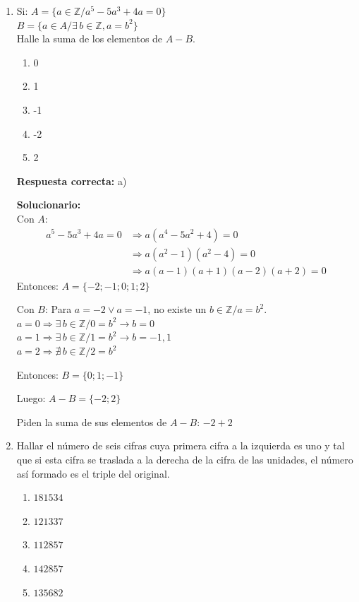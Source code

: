 \begin{enumerate}
	
	
	\item Si: 
	$A = \{ a \in \mathbb{Z} / a^5 - 5a^3 + 4a = 0 \}$ \\
	$B = \{ a \in A / \exists \, b \in \mathbb{Z}, a = b^2 \}$ \\
	Halle la suma de los elementos de $A - B$.
	
	\begin{enumerate}[label=\alph*)]
	\item 0
	\item 1
	\item -1
	\item -2
	\item 2
	\end{enumerate}
	
	\textbf{Respuesta correcta:} a)
	
	\vspace{2mm}
	\textbf{Solucionario:}\\
	Con $A$: 
	\begin{align*}
		a^5 - 5a^3 + 4a = 0 &\Rightarrow a(a^4 - 5a^2 + 4) = 0 \\
		&\Rightarrow a(a^2 - 1)(a^2 - 4) = 0 \\
		&\Rightarrow a(a-1)(a+1)(a-2)(a+2) = 0
	\end{align*}
	Entonces: $A = \{ -2; -1; 0; 1; 2 \}$
	
	Con $B$: Para $a = -2 \vee a = -1$, no existe un $b \in \mathbb{Z} / a = b^2$. \\
	$a = 0 \Rightarrow \exists \, b \in \mathbb{Z} / 0 = b^2 \rightarrow b = 0$ \\
	$a = 1 \Rightarrow \exists \, b \in \mathbb{Z} / 1 = b^2 \rightarrow b = -1, 1$ \\
	$a = 2 \Rightarrow \nexists \, b \in \mathbb{Z} / 2 = b^2$
	
	Entonces: $B = \{ 0; 1; -1 \}$
	
	Luego: $A - B = \{ -2; 2 \}$
	
	Piden la suma de sus elementos de $A - B$: $-2 + 2 $
	
	
	\vspace{6mm}
	
	
	\item Hallar el número de seis cifras cuya primera cifra a la izquierda es uno y tal que si esta cifra se traslada a la derecha de la cifra de las unidades, el número así formado es el triple del original.
	
	\begin{enumerate}[label=\alph*)]
		\item $181534$
		\item $121337$
		\item $112857$
		\item $142857$
		\item $135682$
	\end{enumerate}
	

\end{enumerate}
